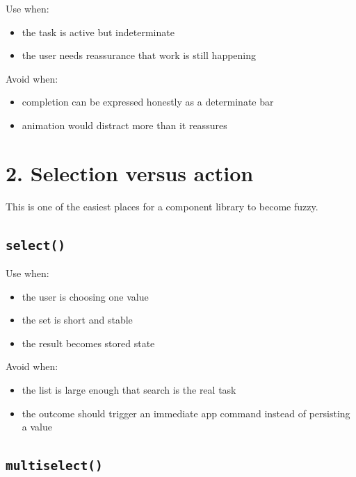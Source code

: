 Use when:

\begin{itemize}
\tightlist
\item
  the task is active but indeterminate
\item
  the user needs reassurance that work is still happening
\end{itemize}

Avoid when:

\begin{itemize}
\tightlist
\item
  completion can be expressed honestly as a determinate bar
\item
  animation would distract more than it reassures
\end{itemize}

\section{2. Selection versus action}\label{record-023-selection-versus-action}

This is one of the easiest places for a component library to become fuzzy.

\subsection{\texorpdfstring{\texttt{s\allowbreak{}e\allowbreak{}l\allowbreak{}e\allowbreak{}c\allowbreak{}t\allowbreak{}(\allowbreak{})}}{}}\label{record-023-select}

Use when:

\begin{itemize}
\tightlist
\item
  the user is choosing one value
\item
  the set is short and stable
\item
  the result becomes stored state
\end{itemize}

Avoid when:

\begin{itemize}
\tightlist
\item
  the list is large enough that search is the real task
\item
  the outcome should trigger an immediate app command instead of persisting a value
\end{itemize}

\subsection{\texorpdfstring{\texttt{m\allowbreak{}u\allowbreak{}l\allowbreak{}t\allowbreak{}i\allowbreak{}s\allowbreak{}e\allowbreak{}l\allowbreak{}e\allowbreak{}c\allowbreak{}t\allowbreak{}(\allowbreak{})}}{}}\label{record-023-multiselect}

